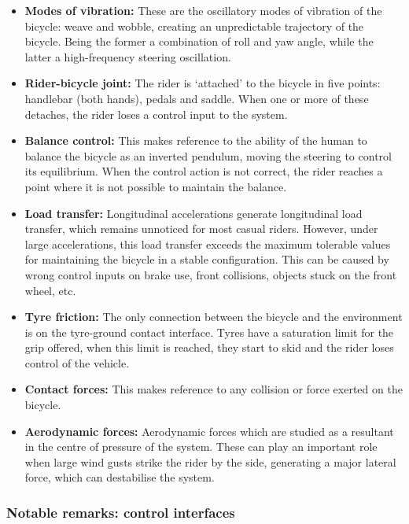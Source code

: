 \documentclass{article}
\begin{document}
\begin{itemize}
    \item \textbf{Modes of vibration:} These are the oscillatory modes of vibration of the bicycle: weave and wobble, creating an unpredictable trajectory of the bicycle.
        Being the former a combination of roll and yaw angle, while the latter a high-frequency steering oscillation.
    \item \textbf{Rider-bicycle joint:} The rider is `attached' to the bicycle in five points: handlebar (both hands), pedals and saddle.
        When one or more of these detaches, the rider loses a control input to the system.
    \item \textbf{Balance control:} This makes reference to the ability of the human to balance the bicycle as an inverted pendulum, moving the steering to control its equilibrium.
        When the control action is not correct, the rider reaches a point where it is not possible to maintain the balance.
    \item \textbf{Load transfer:}  Longitudinal accelerations generate longitudinal load transfer, which remains unnoticed for most casual riders.
        However, under large accelerations, this load transfer exceeds the maximum tolerable values for maintaining the bicycle in a stable configuration.
        This can be caused by wrong control inputs on brake use, front collisions, objects stuck on the front wheel, etc.
    \item \textbf{Tyre friction:} The only connection between the bicycle and the environment is on the tyre-ground contact interface.
        Tyres have a saturation limit for the grip offered, when this limit is reached, they start to skid and the rider loses control of the vehicle.
    \item \textbf{Contact forces:}  This makes reference to any collision or force exerted on the bicycle.
    \item \textbf{Aerodynamic forces:} Aerodynamic forces which are studied as a resultant in the centre of pressure of the system.
        These can play an important role when large wind gusts strike the rider by the side, generating a major lateral force, which can destabilise the system.
\end{itemize}


\subsubsection{Notable remarks: control interfaces}
\end{document}
